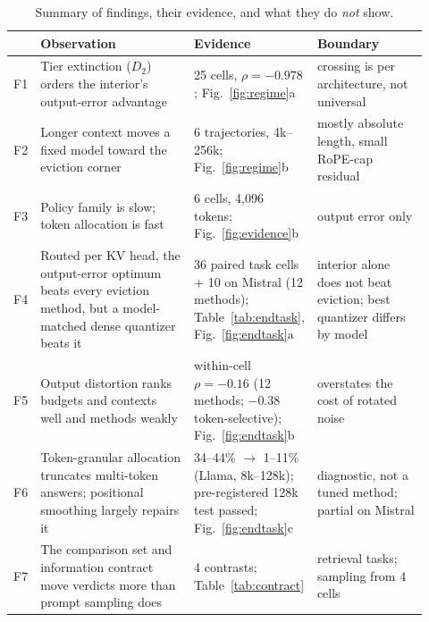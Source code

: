 \documentclass{article}
\theoremstyle{definition}
\begin{document}
\begin{table}[t]
\centering
\small
\setlength{\tabcolsep}{4pt}
\caption{Summary of findings, their evidence, and what they do \emph{not} show.}
\label{tab:findings}
\begin{tabular}{@{}p{0.03\linewidth}p{0.40\linewidth}p{0.20\linewidth}p{0.29\linewidth}@{}}
\toprule
& \textbf{Observation} & \textbf{Evidence} & \textbf{Boundary} \\
\midrule
F1 & Tier extinction ($D_2$) orders the interior's output-error advantage & 25 cells, $\rho=-0.978$; Fig.~\ref{fig:regime}a & crossing is per architecture, not universal \\
F2 & Longer context moves a fixed model toward the eviction corner & 6 trajectories, 4k--256k; Fig.~\ref{fig:regime}b & mostly absolute length, small RoPE-cap residual \\
F3 & Policy family is slow; token allocation is fast & 6 cells, 4,096 tokens; Fig.~\ref{fig:evidence}b & output error only \\
F4 & Routed per KV head, the output-error optimum beats every eviction method, but a model-matched dense quantizer beats it & 36 paired task cells + 10 on Mistral (12 methods); Table~\ref{tab:endtask}, Fig.~\ref{fig:endtask}a & interior alone does not beat eviction; best quantizer differs by model \\
F5 & Output distortion ranks budgets and contexts well and methods weakly & within-cell $\rho=-0.16$ (12 methods; $-0.38$ token-selective); Fig.~\ref{fig:endtask}b & overstates the cost of rotated noise \\
F6 & Token-granular allocation truncates multi-token answers; positional smoothing largely repairs it & 34--44\% $\to$ 1--11\% (Llama, 8k--128k); pre-registered 128k test passed; Fig.~\ref{fig:endtask}c & diagnostic, not a tuned method; partial on Mistral \\
F7 & The comparison set and information contract move verdicts more than prompt sampling does & 4 contrasts; Table~\ref{tab:contract} & retrieval tasks; sampling from 4 cells \\ %
\bottomrule
\end{tabular}
\vspace{-2mm}
\end{table}
\end{document}
